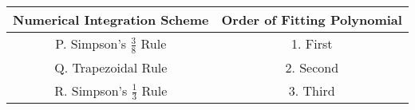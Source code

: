 \begin{tabular}[12pt]{ |c| c|}
    \hline
    \textbf{Numerical Integration Scheme} & \textbf{Order of Fitting Polynomial} \\ 
    \hline
    P. Simpson's $\frac{3}{8}$ Rule  & 1. First \\
    \hline 
    Q. Trapezoidal Rule & 2. Second \\
    \hline
    R. Simpson's $\frac{1}{3}$ Rule  & 3. Third \\
    \hline
    \end{tabular}
